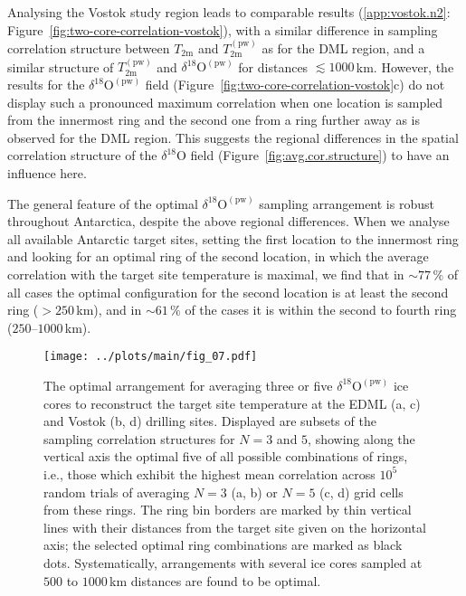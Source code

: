 \documentclass[draft]{agujournal2019}
\begin{document}
Analysing the Vostok study region leads to comparable results
(\ref{app:vostok.n2}: Figure~\ref{fig:two-core-correlation-vostok}), with a
similar difference in sampling correlation structure between $T_{\mathrm{2m}}$
and $T_{\mathrm{2m}}^{\mathrm{(pw)}}$ as for the DML region, and a similar
structure of $T_{\mathrm{2m}}^{\mathrm{(pw)}}$ and
$\delta^{18}\mathrm{O}^{\mathrm{(pw)}}$ for distances $\lesssim1000$\,km.
However, the results for the $\delta^{18}\mathrm{O}^{\mathrm{(pw)}}$ field
(Figure~\ref{fig:two-core-correlation-vostok}c) do not display such a pronounced
maximum correlation when one location is sampled from the innermost ring and the
second one from a ring further away as is observed for the DML region. This
suggests the regional differences in the spatial correlation structure of the
$\delta^{18}\mathrm{O}$ field (Figure~\ref{fig:avg.cor.structure}) to have an
influence here.

The general feature of the optimal $\delta^{18}\mathrm{O}^{\mathrm{(pw)}}$
sampling arrangement is robust throughout Antarctica, despite the above regional
differences. When we analyse all available Antarctic target sites, setting the
first location to the innermost ring and looking for an optimal ring of the
second location, in which the average correlation with the target site
temperature is maximal, we find that in $\sim77\,\%$ of all cases the optimal
configuration for the second location is at least the second ring ($>250$\,km),
and in $\sim61\,\%$ of the cases it is within the second to fourth ring
($250$--$1000$\,km).

\begin{figure*}[t]%
\centering
\texttt{[image: ../plots/main/fig\_07.pdf]}
\caption{%
  The optimal arrangement for averaging three or five
  $\delta^{18}\mathrm{O}^{\mathrm{(pw)}}$ ice cores to reconstruct the target
  site temperature at the EDML (a, c) and Vostok (b, d) drilling
  sites. Displayed are subsets of the sampling correlation structures for $N=3$
  and $5$, showing along the vertical axis the optimal five of all possible
  combinations of rings, i.e., those which exhibit the highest mean correlation
  across $10^5$ random trials of averaging $N=3$ (a, b) or $N=5$ (c, d) grid
  cells from these rings. The ring bin borders are marked by thin vertical lines
  with their distances from the target site given on the horizontal axis; the
  selected optimal ring combinations are marked as black dots. Systematically,
  arrangements with several ice cores sampled at $500$ to $1000$\,km distances
  are found to be optimal.}
\label{fig:binning}%
\end{figure*}%
\end{document}
